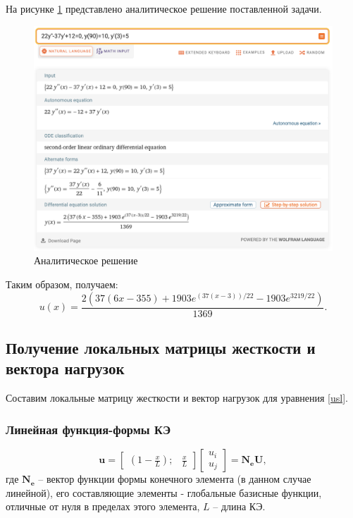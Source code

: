 На рисунке \ref{analit} представлено аналитическое решение поставленной задачи.
\begin{figure}[!h]
\begin{center}
\includegraphics[scale = 0.5]{labs/img/img1}
\end{center}
\caption{Аналитическое решение}
\label{analit}
\end{figure}

Таким образом, получаем:
$$
u(x)=\frac{2\left(37(6 x-355)+1903 e^{(37(x-3)) / 22}-1903 e^{3219 / 22}\right)}{1369}.
$$


\subsection{Получение локальных матрицы жесткости и вектора нагрузок}

Составим локальные матрицу жесткости и вектор нагрузок для уравнения \ref{usl}.

\subsubsection{Линейная функция-формы КЭ}

$$
\mathbf{u}=\begin{bmatrix}
(1-\frac{x}{L}) ; & \frac{x}{L}
\end{bmatrix}
\begin{bmatrix}
u_i \\
u_j
\end{bmatrix}
=\mathbf{N_eU},
$$
где $\mathbf{N_e}$ -- вектор функции формы конечного элемента (в данном случае линейной), его составляющие элементы - глобальные базисные функции, отличные от нуля в пределах этого элемента, $L$ -- длина КЭ.

